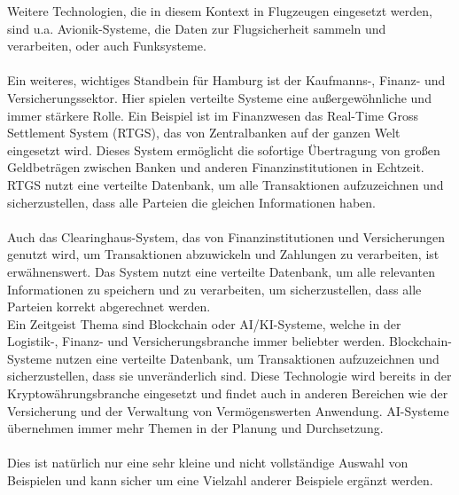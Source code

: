 Weitere Technologien, die in diesem Kontext in Flugzeugen eingesetzt werden, sind u.a. Avionik-Systeme, die Daten zur Flugsicherheit sammeln und verarbeiten, oder auch Funksysteme.
\\\\
Ein weiteres, wichtiges Standbein für Hamburg ist der Kaufmanns-, Finanz- und Versicherungssektor. Hier spielen verteilte Systeme eine außergewöhnliche und immer stärkere Rolle. Ein Beispiel ist im Finanzwesen das Real-Time Gross Settlement System (RTGS)\cite{rtgs}, das von Zentralbanken auf der ganzen Welt eingesetzt wird. Dieses System ermöglicht die sofortige Übertragung von großen Geldbeträgen zwischen Banken und anderen Finanzinstitutionen in Echtzeit. RTGS nutzt eine verteilte Datenbank, um alle Transaktionen aufzuzeichnen und sicherzustellen, dass alle Parteien die gleichen Informationen haben.
\\\\
Auch das Clearinghaus-System\cite{clearinghouse}, das von Finanzinstitutionen und Versicherungen genutzt wird, um Transaktionen abzuwickeln und Zahlungen zu verarbeiten, ist erwähnenswert. Das System nutzt eine verteilte Datenbank, um alle relevanten Informationen zu speichern und zu verarbeiten, um sicherzustellen, dass alle Parteien korrekt abgerechnet werden.
\\
Ein Zeitgeist Thema sind Blockchain\cite{blockchain} oder AI/KI-Systeme, welche in der Logistik-, Finanz- und Versicherungsbranche immer beliebter werden. Blockchain-Systeme nutzen eine verteilte Datenbank, um Transaktionen aufzuzeichnen und sicherzustellen, dass sie unveränderlich sind. Diese Technologie wird bereits in der Kryptowährungsbranche eingesetzt und findet auch in anderen Bereichen wie der Versicherung und der Verwaltung von Vermögenswerten Anwendung. AI-Systeme übernehmen immer mehr Themen in der Planung und Durchsetzung.
\\\\
Dies ist natürlich nur eine sehr kleine und nicht vollständige Auswahl von Beispielen und kann sicher um eine Vielzahl anderer Beispiele ergänzt werden. 